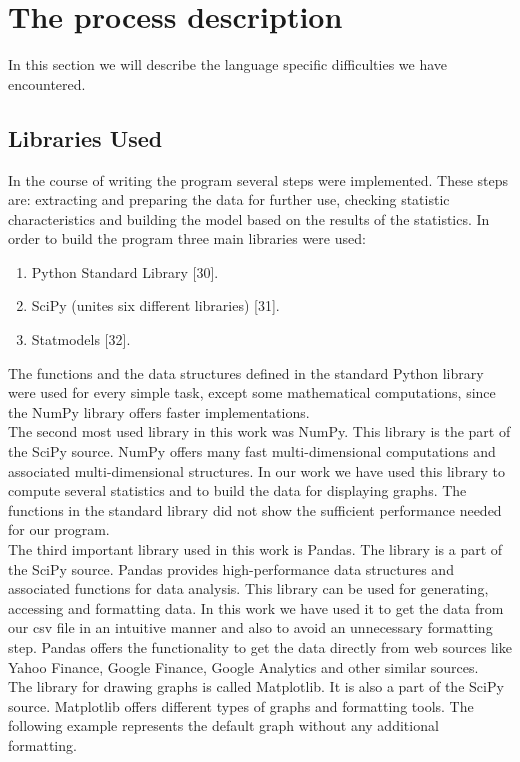 \documentclass[
  twoside,
  11pt, a4paper,
  footinclude=true,
  headinclude=true,
  cleardoublepage=empty
]{scrreprt}
\begin{document}
    \section{The process description}
    In this section we will describe the language specific difficulties we have encountered.
    \subsection{Libraries Used}
    In the course of writing the program several steps were implemented. These steps are: extracting and preparing the data for further use, checking statistic characteristics and building the model based on the results of the statistics. In order to build the program three main libraries were used:
    \begin{enumerate}
        \item Python Standard Library [30].
        \item SciPy (unites six different libraries) [31].
        \item Statmodels [32].
    \end{enumerate}
    The functions and the data structures defined in the standard Python library were used for every simple task, except some mathematical computations, since the NumPy library offers faster implementations.\\
    The second most used library in this work was NumPy. This library is the part of the SciPy source. NumPy offers many fast multi-dimensional computations and associated multi-dimensional structures. In our work we have used this library to compute several statistics and to build the data for displaying graphs. The functions in the standard library did not show the sufficient performance needed for our program.\\
    The third important library used in this work is Pandas. The library is a part of the SciPy source. Pandas provides high-performance data structures and associated functions for data analysis. This library can be used for generating, accessing and formatting data. In this work we have used it to get the data from our csv file in an intuitive manner and also to avoid an unnecessary formatting step. Pandas offers the functionality to get the data directly from web sources like Yahoo Finance, Google Finance, Google Analytics and other similar sources.\\
    The library for drawing graphs is called Matplotlib. It is also a part of the SciPy source. Matplotlib offers different types of graphs and formatting tools. The following example represents the default graph without any additional formatting.\\
\end{document}
